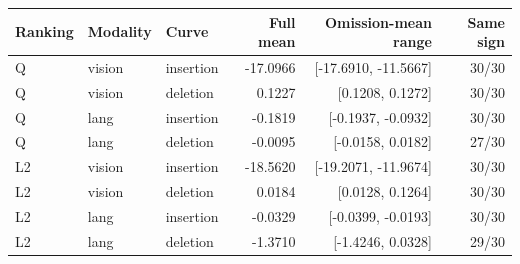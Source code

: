 \begin{tabular}{lllrrr}
\toprule
Ranking & Modality & Curve & Full mean & Omission-mean range & Same sign \\
\midrule
Q & vision & insertion & -17.0966 & [-17.6910, -11.5667] & 30/30 \\
Q & vision & deletion & 0.1227 & [0.1208, 0.1272] & 30/30 \\
Q & lang & insertion & -0.1819 & [-0.1937, -0.0932] & 30/30 \\
Q & lang & deletion & -0.0095 & [-0.0158, 0.0182] & 27/30 \\
L2 & vision & insertion & -18.5620 & [-19.2071, -11.9674] & 30/30 \\
L2 & vision & deletion & 0.0184 & [0.0128, 0.1264] & 30/30 \\
L2 & lang & insertion & -0.0329 & [-0.0399, -0.0193] & 30/30 \\
L2 & lang & deletion & -1.3710 & [-1.4246, 0.0328] & 29/30 \\
\bottomrule
\end{tabular}

